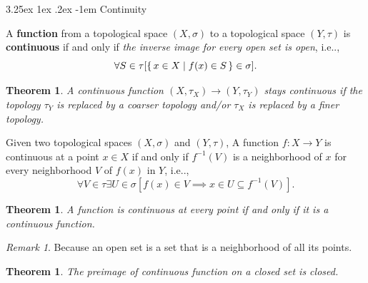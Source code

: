 \documentclass[12pt, letterpaper]{article}
\makeatletter
\renewcommand\subparagraph{\@startsection{subparagraph}{5}{\parindent}%
	{3.25ex \@plus1ex \@minus .2ex}%
	{0.75ex plus 0.1ex}%
	{\normalfont\normalsize\bfseries}}
\newcommand{\calS}{\mathcal{S}}
\newcommand\ie{i.e\@ifnextchar.{}{.\@}}
\newtheorem{thm}[prop]{Theorem}
\renewcommand\subparagraph{\@startsection{subparagraph}{5}{\parindent}%
	{3.25ex \@plus1ex \@minus .2ex}%
	{-1em}%
	{\normalfont\normalsize\bfseries}}
\theoremstyle{definition}
\theoremstyle{remark}
\newtheorem*{rem*}{Remark}
\theoremstyle{definition}
\theoremstyle{plain}
\numberwithin{equation}{section}
\makeatother
\begin{document}
	\subparagraph{Continuity}
	\begin{def*}
		A \textbf{function} from a topological space $(X,\sigma)$ to a topological space $(Y,\tau)$
		is \textbf{continuous} if and only if \textit{the inverse image for every open set is open}, \ie,
		\[\forall S\in\tau[\set{x\in X|f(x)\in S}\in\sigma]. \]
	\end{def*}
	\begin{thm}
		A continuous function
		$\left(X,\tau _{X}\right)\to \left(Y,\tau _{Y}\right)$
		stays continuous if the topology $\tau _{Y}$ is replaced by a coarser topology and/or $\tau _{X}$ is replaced by a finer topology.
	\end{thm}
	\begin{def*}
		Given two topological spaces $(X,\sigma)$ and $(Y,\tau)$,
		A function $f\colon X\to Y$ is continuous at a point $x\in X$
		if and only if $f^{{-1}}(V)$ is a neighborhood of $x$ for every neighborhood $V$ of $f(x)$ in $Y$,
		\ie,
		\[ \forall V\in\tau\exists U\in\sigma[f(x)\in V \implies x\in U\subseteq f^{-1}(V) ] .\]
	\end{def*}
	\begin{thm}
		A function is continuous at every point if and only if it is a continuous function.
	\end{thm}
	\begin{rem*}
		Because an open set is a set that is a neighborhood of all its points.
	\end{rem*}

	\begin{thm}
		The preimage of continuous function on a closed set is closed.
	\end{thm}
\end{document}
